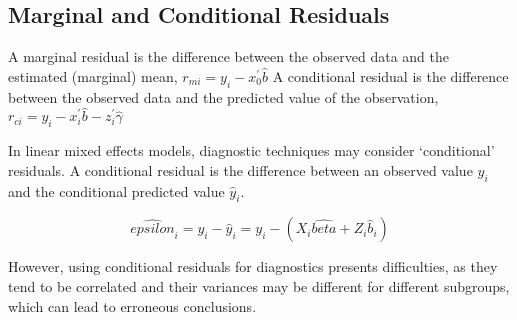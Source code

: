 \documentclass[Main.tex]{subfiles}
\begin{document}
\subsection{Marginal and Conditional Residuals}

A marginal residual is the difference between the observed data and the estimated (marginal) mean, $r_{mi} = y_i - x_0^{\prime} \hat{b}$
A conditional residual is the difference between the observed data and the predicted value of the observation,
$r_{ci} = y_i - x_i^{\prime} \hat{b} - z_i^{\prime} \hat{\gamma}$

In linear mixed effects models, diagnostic techniques may consider `conditional' residuals. A conditional residual is the difference between an observed value $y_{i}$ and the conditional predicted value $\hat{y}_{i} $.

\[ \hat{epsilon}_{i} = y_{i} - \hat{y}_{i} = y_{i} - ( X_{i}\hat{beta} + Z_{i}\hat{b}_{i}) \]

However, using conditional residuals for diagnostics presents difficulties, as they tend to be correlated and their variances may be different for different subgroups, which can lead to erroneous conclusions.

\end{document}
